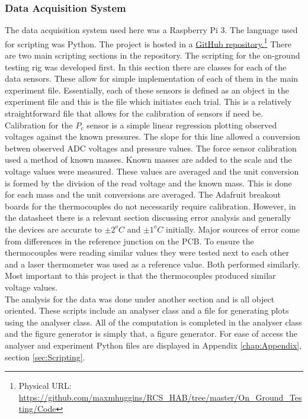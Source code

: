 \subsubsection{Data Acquisition System}
The data acquisition system used here was a Raspberry Pi 3. The language used for scripting was Python. The project is hosted in a \href{https://github.com/maxmhuggins/RCS_HAB/tree/master/On_Ground_Testing/Code}{GitHub repository.}\footnote{Physical URL: \url{https://github.com/maxmhuggins/RCS_HAB/tree/master/On_Ground_Testing/Code}} There are two main scripting sections in the repository. The scripting for the on-ground testing rig was developed first. In this section there are classes for each of the data sensors. These allow for simple implementation of each of them in the main experiment file. Essentially, each of these sensors is defined as an object in the experiment file and this is the file which initiates each trial. This is a relatively straightforward file that allows for the calibration of sensors if need be. Calibration for the $P_c$ sensor is a simple linear regression plotting observed voltages against the known pressures. The slope for this line allowed a conversion betwen observed ADC voltages and pressure values. The force sensor calibration used a method of known masses. Known masses are added to the scale and the voltage values were measured. These values are averaged and the unit conversion is formed by the division of the read voltage and the known mass. This is done for each mass and the unit conversions are averaged. The Adafruit breakout boards for the thermocouples do not necessarily require calibration. However, in the datasheet \cite{thermocouple} there is a relevant section discussing error analysis and generally the devices are accurate to $\pm 2^oC$ and $\pm 1^oC$ initially. Major sources of error come from differences in the reference junction on the PCB. To ensure the thermocouples were reading similar values they were tested next to each other and a laser thermometer was used as a reference value. Both performed similarly. Most important to this project is that the thermocouples produced similar voltage values.\\
The analysis for the data was done under another section and is all object oriented. These scripts include an analyser class and a file for generating plots using the analyser class. All of the computation is completed in the analyser class and the figure generator is simply that, a figure generator. For ease of access the analyser and experiment Python files are displayed in Appendix \ref{chap:Appendix}, section \ref{sec:Scripting}.
